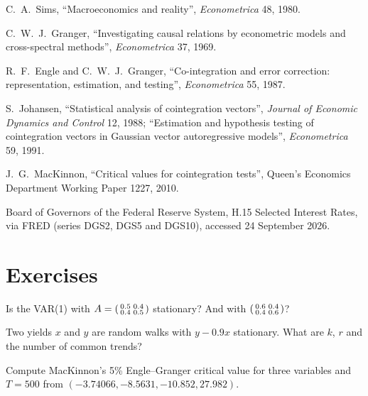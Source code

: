 \begin{omsources}
\item C.~A.~Sims, ``Macroeconomics and reality'', \emph{Econometrica} 48, 1980.
\item C.~W.~J.~Granger, ``Investigating causal relations by econometric models and cross-spectral methods'', \emph{Econometrica} 37, 1969.
\item R.~F.~Engle and C.~W.~J.~Granger, ``Co-integration and error correction: representation, estimation, and testing'', \emph{Econometrica} 55, 1987.
\item S.~Johansen, ``Statistical analysis of cointegration vectors'', \emph{Journal of Economic Dynamics and Control} 12, 1988; ``Estimation and hypothesis
testing of cointegration vectors in Gaussian vector autoregressive models'', \emph{Econometrica} 59, 1991.
\item J.~G.~MacKinnon, ``Critical values for cointegration tests'', Queen's Economics Department Working Paper 1227, 2010.
\item Board of Governors of the Federal Reserve System, H.15 Selected Interest Rates, via FRED (series DGS2, DGS5 and DGS10), accessed 24 September 2026.
\end{omsources}

\section{Exercises}

\begin{exercise}[$\star$]\label{exo:qm:multivariate-series-and-cointegration:1}
Is the VAR(1) with $A = \begin{psmallmatrix}0.5 & 0.4\\ 0.4 & 0.5\end{psmallmatrix}$ stationary? And with $\begin{psmallmatrix}0.6 & 0.4\\ 0.4 & 0.6\end{psmallmatrix}$?
\end{exercise}

\begin{exercise}[$\star$]\label{exo:qm:multivariate-series-and-cointegration:2}
Two yields $x$ and $y$ are random walks with $y - 0.9x$ stationary. What are $k$, $r$ and the number of common trends?
\end{exercise}

\begin{exercise}[$\star$]\label{exo:qm:multivariate-series-and-cointegration:3}
Compute MacKinnon's 5\% Engle--Granger critical value for three variables and $T = 500$ from $(-3.74066, -8.5631, -10.852, 27.982)$.
\end{exercise}

